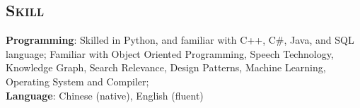 \begin{resume}
\vspace*{-12pt}
\section{\textsc{Skill}}
\textbf{Programming}: Skilled in Python, and familiar with C++, C\#, Java, and SQL language; Familiar with Object Oriented Programming, Speech Technology, Knowledge Graph, Search Relevance, Design Patterns, Machine Learning, Operating System and Compiler;  \\
\vspace*{-6pt}
\newline
\textbf{Language}: Chinese (native), English (fluent)


\end{resume}




